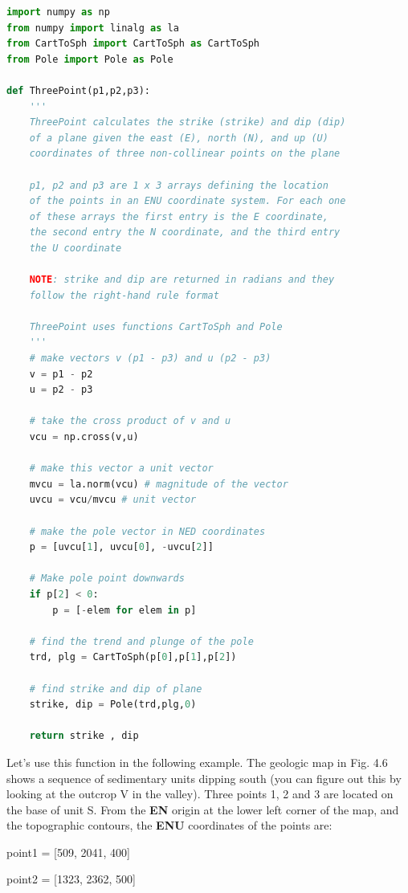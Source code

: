\documentclass[a4paper , 12pt]{book}
\begin{document}
\begin{lstlisting}[language=Python, frame=single]
import numpy as np
from numpy import linalg as la
from CartToSph import CartToSph as CartToSph
from Pole import Pole as Pole

def ThreePoint(p1,p2,p3):
    '''
    ThreePoint calculates the strike (strike) and dip (dip) 
    of a plane given the east (E), north (N), and up (U) 
    coordinates of three non-collinear points on the plane
    
    p1, p2 and p3 are 1 x 3 arrays defining the location 
    of the points in an ENU coordinate system. For each one 
    of these arrays the first entry is the E coordinate, 
    the second entry the N coordinate, and the third entry 
    the U coordinate

    NOTE: strike and dip are returned in radians and they 
    follow the right-hand rule format

    ThreePoint uses functions CartToSph and Pole
    '''
    # make vectors v (p1 - p3) and u (p2 - p3)
    v = p1 - p2
    u = p2 - p3
    
    # take the cross product of v and u
    vcu = np.cross(v,u)
    
    # make this vector a unit vector
    mvcu = la.norm(vcu) # magnitude of the vector
    uvcu = vcu/mvcu # unit vector
    
    # make the pole vector in NED coordinates
    p = [uvcu[1], uvcu[0], -uvcu[2]]

    # Make pole point downwards
    if p[2] < 0:
        p = [-elem for elem in p]
        
    # find the trend and plunge of the pole
    trd, plg = CartToSph(p[0],p[1],p[2])
    
    # find strike and dip of plane
    strike, dip = Pole(trd,plg,0)
    
    return strike , dip
\end{lstlisting}

Let's use this function in the following example. The geologic map in Fig. 4.6 shows a sequence of sedimentary units dipping south (you can figure out this by looking at the outcrop V in the valley). Three points 1, 2 and 3 are located on the base of unit S. From the \textbf{EN} origin at the lower left corner of the map, and the topographic contours, the \textbf{ENU} coordinates of the points are: 

point1 = [509, 2041, 400]

point2 = [1323, 2362, 500]
\end{document}
